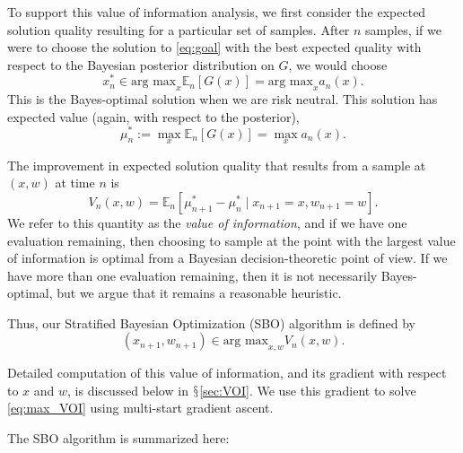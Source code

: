 \documentclass{article} %
\newcommand{\w}{w}
\begin{document}
To support this value of information analysis, we first consider the expected solution quality resulting for a particular set of samples.
After $n$ samples, if we were to choose the solution to \eqref{eq:goal} with the best expected quality with respect to the Bayesian posterior distribution on $G$, we would choose
\begin{equation*}
x_{n}^{*} \in \mbox{arg max}_{x}\mathbb{E}_{n}\left[G(x)\right]=\mbox{arg max}_{x} a_n(x).
\end{equation*}
This is the Bayes-optimal solution when we are risk neutral.
This solution has expected value (again, with respect to the posterior),
\begin{equation*}
\mu_n^* := \max_{x}\mathbb{E}_{n}\left[G(x)\right]=\max_{x} a_n(x).
\end{equation*}

The improvement in expected solution quality that results from a sample at $(x,\w)$ at time $n$ is 
\begin{equation}
    V_n(x,\w) = \mathbb{E}_n\left[ \mu_{n+1}^* - \mu_n^* \mid x_{n+1}=x, \w_{n+1}=\w\right].
    \label{eq:VOI}
\end{equation}
We refer to this quantity as the {\it value of information}, and if we have one evaluation remaining, then choosing to sample at the point with the largest value of information is optimal from a Bayesian decision-theoretic point of view.
If we have more than one evaluation remaining, then it is not necessarily Bayes-optimal, but we argue that it remains a reasonable heuristic.

Thus, our Stratified Bayesian Optimization (SBO) algorithm is defined by
\begin{equation}
    \left(x_{n+1},\w_{n+1}\right)\in\mbox{arg max}_{x,\w}V_{n}\left(x,\w\right).  \label{eq:max_VOI}
\end{equation}

Detailed computation of this value of information, and its gradient with respect to $x$ and $\w$, is discussed below in $\mathsection$\ref{sec:VOI}.  We use this gradient to solve \eqref{eq:max_VOI} using multi-start gradient ascent.

The SBO algorithm is summarized here:
\end{document}
